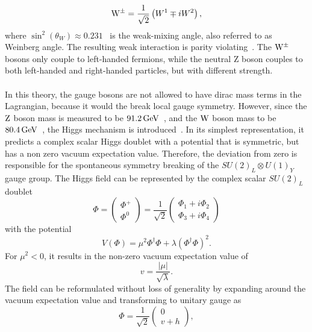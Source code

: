 \begin{equation}
 \mathrm{W}^\pm = \frac{1}{\sqrt{2}}\left(W^1\mp i W^2\right),
\end{equation}
where $\sin^2(\theta_W)\approx0.231$~\cite{PDG} is the weak-mixing angle, also referred to as Weinberg angle.
The resulting weak interaction is parity violating~\cite{Wu,Goldhaber}. The $\mathrm{W}^\pm$ bosons only couple to left-handed fermions, while the neutral Z boson couples to both left-handed and right-handed particles, but with different strength.\\
\\In this theory, the gauge bosons are not allowed to have dirac mass terms in the Lagrangian, because it would the break local gauge symmetry. However, since the $\mathrm{Z}$ boson mass is measured to be $91.2\,\text{Ge\hspace{-.08em}V}$~\cite{PDG}, and the $\mathrm{W}$ boson mass to be $80.4\,\text{Ge\hspace{-.08em}V}$~\cite{PDG}, the Higgs mechanism is introduced~\cite{Higgs1,Higgs2,Higgs3}. In its simplest representation, it predicts a complex scalar Higgs doublet with a potential that is symmetric, but has a non zero vacuum expectation value. Therefore, the deviation from zero is responsible for the spontaneous symmetry breaking of the $ SU(2)_L\otimes U(1)_Y$ gauge group. The Higgs field can be represented by the complex scalar $SU(2)_L$ doublet
\begin{equation}
 \Phi=
 \left(\begin{matrix}
   \Phi^{+} \\
   \Phi^0
  \end{matrix}
 \right)
 =
 \frac{1}{\sqrt{2}}
 \left(\begin{matrix}
   \Phi_1 + i \Phi_2 \\
   \Phi_3 + i\Phi_4
  \end{matrix}
 \right)
\end{equation}
with the potential
\begin{equation}
 V(\Phi)=\mu^2 \Phi^{\dagger}\Phi+\lambda\left(\Phi^{\dagger}\Phi\right)^2.
\end{equation}
For $\mu^2<0$, it results in the non-zero vacuum expectation value of
\begin{equation}
 v = \frac{|\mu|}{\sqrt{\lambda}}.
\end{equation}
The field can be reformulated without loss of generality by expanding around the vacuum expectation value and transforming to unitary gauge as
\begin{equation}
 \Phi = \frac{1}{\sqrt{2}}
 \left(\begin{matrix}
   0 \\
   v+h
  \end{matrix}
 \right),
\end{equation}
